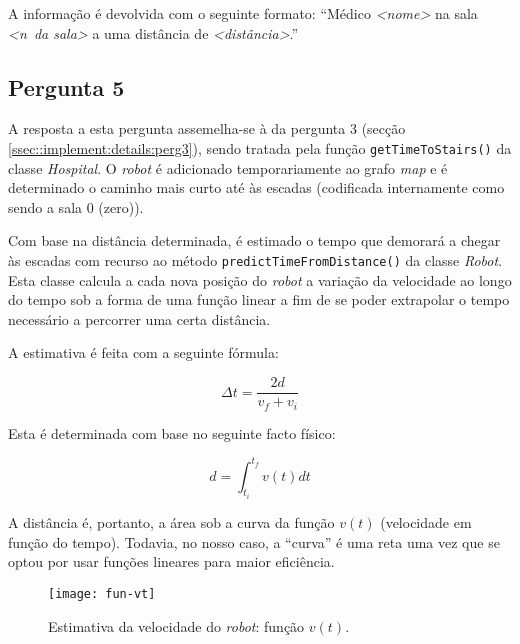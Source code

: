 A informação é devolvida com o seguinte formato: ``Médico \textit{<nome>} na sala \textit{<n\textordmasculine~da sala>} a uma distância de \textit{<distância>}.''


\subsection{Pergunta 5}
\label{ssec::implement:details:perg5}


A resposta a esta pergunta assemelha-se à da pergunta 3 (secção \ref{ssec::implement:details:perg3}), sendo tratada pela função \texttt{getTimeToStairs()} da classe \textit{Hospital}. O \textit{robot} é adicionado temporariamente ao grafo \textit{map} e é determinado o caminho mais curto até às escadas (codificada internamente como sendo a sala 0 (zero)).

Com base na distância determinada, é estimado o tempo que demorará a chegar às escadas com recurso ao método \texttt{predictTimeFromDistance()} da classe \textit{Robot}. Esta classe calcula a cada nova posição do \textit{robot} a variação da velocidade ao longo do tempo sob a forma de uma função linear a fim de se poder extrapolar o tempo necessário a percorrer uma certa distância.

A estimativa é feita com a seguinte fórmula:

\begin{equation}
    \Delta t = \frac{2d}{v_f + v_i}
    \label{eq::time_from_distance}
\end{equation}

Esta é determinada com base no seguinte facto físico:

\begin{equation}
    d = \int_{t_i}^{t_f}{v(t)dt}
\end{equation}

A distância é, portanto, a área sob a curva da função $v(t)$ (velocidade em função do tempo). Todavia, no nosso caso, a ``curva'' é uma reta uma vez que se optou por usar funções lineares para maior eficiência.

\begin{figure}[!hbtp]
    \centering
    \texttt{[image: fun-vt]}
    \caption[Estimativa da velocidade do \textit{robot}: função $v(t)$]{Estimativa da velocidade do \textit{robot}: função $v(t)$.}
    \label{fig::fun_vt}
\end{figure}

